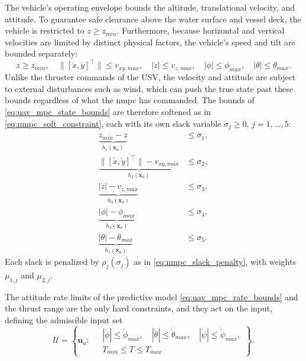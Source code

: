 The vehicle's operating envelope bounds the altitude, translational velocity, and attitude. To guarantee safe clearance above the water surface and vessel deck, the vehicle is restricted to $z \ge z_{min}$. Furthermore, because horizontal and vertical velocities are limited by distinct physical factors, the vehicle's speed and tilt are bounded separately:
\begin{equation}
    z \ge z_{min}, \quad \big\|[\dot x,\dot y]^\top\big\| \le v_{xy,max}, \quad |\dot z| \le v_{z,max}, \quad |\phi| \le \phi_{max}, \quad |\theta| \le \theta_{max}.
    \label{eq:uav_mpc_state_bounds}
\end{equation}
Unlike the thruster commands of the USV, the velocity and attitude are subject to external disturbances such as wind, which can push the true state past these bounds regardless of what the \gls{nmpc} has commanded. The bounds of \eqref{eq:uav_mpc_state_bounds} are therefore softened as in \eqref{eq:nmpc_soft_constraint}, each with its own slack variable $\sigma_j \ge 0$, $j=1,\dots,5$:
\begin{align}
    \underbrace{z_{min} - z}_{h_1(\mathbf{x}_a)} &\le \sigma_1, \label{eq:uav_mpc_slack_z} \\
    \underbrace{\big\|[\dot x,\dot y]^\top\big\| - v_{xy,max}}_{h_2(\mathbf{x}_a)} &\le \sigma_2, \label{eq:uav_mpc_slack_vxy} \\
    \underbrace{|\dot z| - v_{z,max}}_{h_3(\mathbf{x}_a)} &\le \sigma_3, \label{eq:uav_mpc_slack_vz} \\
    \underbrace{|\phi| - \phi_{max}}_{h_4(\mathbf{x}_a)} &\le \sigma_4, \label{eq:uav_mpc_slack_phi} \\
    \underbrace{|\theta| - \theta_{max}}_{h_5(\mathbf{x}_a)} &\le \sigma_5. \label{eq:uav_mpc_slack_theta}
\end{align}
Each slack is penalized by $\rho_j(\sigma_j)$ as in \eqref{eq:nmpc_slack_penalty}, with weights $\mu_{1,j}$ and $\mu_{2,j}$.

The attitude rate limits of the predictive model \eqref{eq:uav_mpc_rate_bounds} and the thrust range are the only hard constraints, and they act on the input, defining the admissible input set
\begin{equation}
    \mathcal{U} = \left\{ \mathbf{u}_a : \;
    \begin{aligned}
        & |\dot\phi| \le \dot\phi_{max}, \quad |\dot\theta| \le \dot\theta_{max}, \quad |\dot\psi| \le \dot\psi_{max}, \\
        & T_{min} \le T \le T_{max}
    \end{aligned}
    \right\}.
    \label{eq:uav_mpc_input_set}
\end{equation}

